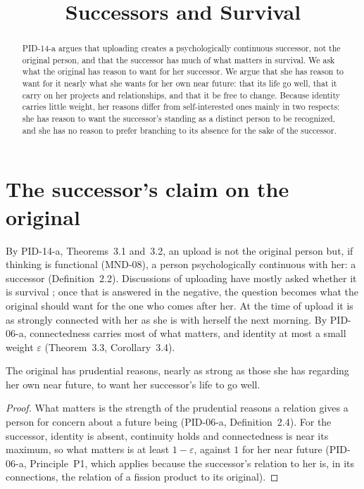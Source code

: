 \documentclass{situationist-preprint}
\title{Successors and Survival}
\begin{document}
\maketitle

\begin{abstract}
PID-14-a argues that uploading creates a psychologically continuous successor, not the original person, and that the successor has much of what matters in survival. We ask what the original has reason to want for her successor. We argue that she has reason to want for it nearly what she wants for her own near future: that its life go well, that it carry on her projects and relationships, and that it be free to change. Because identity carries little weight, her reasons differ from self-interested ones mainly in two respects: she has reason to want the successor's standing as a distinct person to be recognized, and she has no reason to prefer branching to its absence for the sake of the successor.
\end{abstract}

\section{The successor's claim on the original}

By PID-14-a, Theorems~3.1 and~3.2, an upload is not the original person but, if thinking is functional (MND-08), a person psychologically continuous with her: a successor (Definition~2.2). Discussions of uploading have mostly asked whether it is survival \citep{Chalmers2010}; once that is answered in the negative, the question becomes what the original should want for the one who comes after her. At the time of upload it is as strongly connected with her as she is with herself the next morning. By PID-06-a, connectedness carries most of what matters, and identity at most a small weight $\varepsilon$ (Theorem~3.3, Corollary~3.4).

\begin{proposition}\label{p:want}
The original has prudential reasons, nearly as strong as those she has regarding her own near future, to want her successor's life to go well.
\end{proposition}

\begin{proof}
What matters is the strength of the prudential reasons a relation gives a person for concern about a future being (PID-06-a, Definition~2.4). For the successor, identity is absent, continuity holds and connectedness is near its maximum, so what matters is at least $1-\varepsilon$, against $1$ for her near future (PID-06-a, Principle~P1, which applies because the successor's relation to her is, in its connections, the relation of a fission product to its original).
\end{proof}
\end{document}

